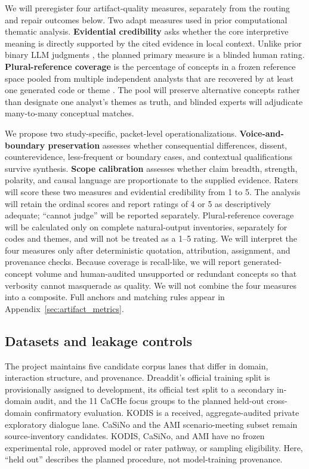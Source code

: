We will preregister four artifact-quality measures, separately from the routing and repair outcomes below. Two adapt measures used in prior computational thematic analysis. \textbf{Evidential credibility} asks whether the core interpretive meaning is directly supported by the cited evidence in local context. Unlike prior binary LLM judgments \citep{qiao2025thematiclm,wang2026centaurta}, the planned primary measure is a blinded human rating. \textbf{Plural-reference coverage} is the percentage of concepts in a frozen reference space pooled from multiple independent analysts that are recovered by at least one generated code or theme \citep{chen2026opencodes}. The pool will preserve alternative concepts rather than designate one analyst's themes as truth, and blinded experts will adjudicate many-to-many conceptual matches.

We propose two study-specific, packet-level operationalizations. \textbf{Voice-and-boundary preservation} assesses whether consequential differences, dissent, counterevidence, less-frequent or boundary cases, and contextual qualifications survive synthesis. \textbf{Scope calibration} assesses whether claim breadth, strength, polarity, and causal language are proportionate to the supplied evidence. Raters will score these two measures and evidential credibility from 1 to 5. The analysis will retain the ordinal scores and report ratings of 4 or 5 as descriptively adequate; ``cannot judge'' will be reported separately. Plural-reference coverage will be calculated only on complete natural-output inventories, separately for codes and themes, and will not be treated as a 1--5 rating. We will interpret the four measures only after deterministic quotation, attribution, assignment, and provenance checks. Because coverage is recall-like, we will report generated-concept volume and human-audited unsupported or redundant concepts so that verbosity cannot masquerade as quality. We will not combine the four measures into a composite. Full anchors and matching rules appear in Appendix~\ref{sec:artifact_metrics}.

\subsection{Datasets and leakage controls}

The project maintains five candidate corpus lanes that differ in domain,
interaction structure, and provenance. Dreaddit's official training split is
provisionally assigned to development, its official test split to a secondary
in-domain audit, and the 11 CaCHe focus groups to the
planned held-out cross-domain confirmatory evaluation. KODIS is a received,
aggregate-audited private exploratory dialogue lane. CaSiNo and the AMI
scenario-meeting subset remain source-inventory candidates. KODIS, CaSiNo, and
AMI have no frozen experimental role, approved model or rater pathway, or
sampling eligibility. Here, ``held out'' describes the planned procedure, not
model-training provenance.

